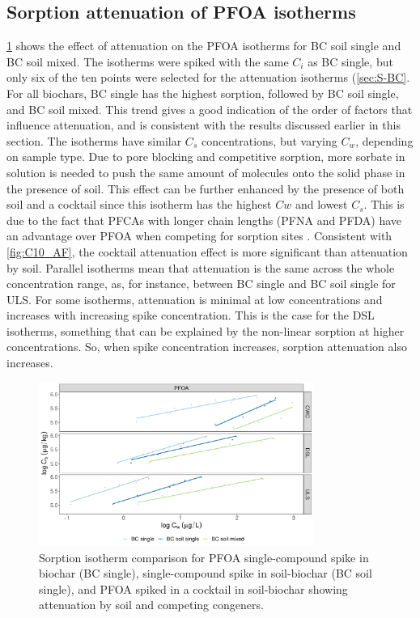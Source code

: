 \subsection{Sorption attenuation of PFOA isotherms}
\cref{fig:PFOA_attenuation} shows the effect of attenuation on the PFOA isotherms for BC soil single and BC soil mixed. The isotherms were spiked with the same $C_i$ as BC single, but only six of the ten points were selected for the attenuation isotherms (\cref{sec:S-BC}. For all biochars, BC single has the highest sorption, followed by BC soil single, and BC soil mixed. This trend gives a good indication of the order of factors that influence attenuation, and is consistent with the results discussed earlier in this section. The isotherms have similar $C_s$ concentrations, but varying $C_w$, depending on sample type. Due to pore blocking and competitive sorption, more sorbate in solution is needed to push the same amount of molecules onto the solid phase in the presence of soil. This effect can be further enhanced by the presence of both soil and a cocktail since this isotherm has the highest $Cw$ and lowest $C_s$. This is due to the fact that PFCAs with longer chain lengths (PFNA and PFDA) have an advantage over PFOA when competing for sorption sites \citep{Sormo2021}. Consistent with \cref{fig:C10_AF}, the cocktail attenuation effect is more significant than attenuation by soil. Parallel isotherms mean that attenuation is the same across the whole concentration range, as, for instance, between BC single and BC soil single for ULS. For some isotherms, attenuation is minimal at low concentrations and increases with increasing spike concentration. This is the case for the DSL isotherms, something that can be explained by the non-linear sorption at higher concentrations. So, when spike concentration increases, sorption attenuation also increases. 

\begin{figure}[htb]
    \centering
    \includegraphics[width=0.8\textwidth]{R/figs/Attenuation_isotherms_PFOA.pdf}
    \caption{Sorption isotherm comparison for PFOA single-compound spike in biochar (BC single), single-compound spike in soil-biochar (BC soil single), and PFOA spiked in a cocktail in soil-biochar showing attenuation by soil and competing congeners.}
    \label{fig:PFOA_attenuation}
\end{figure}

